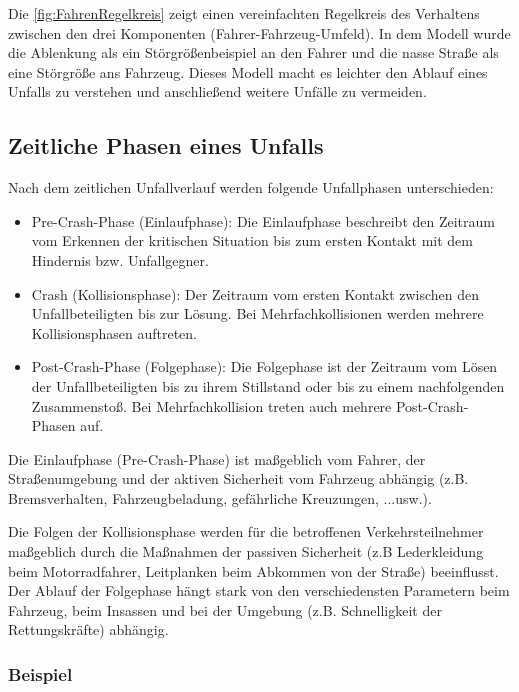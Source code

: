 Die \autoref{fig:FahrenRegelkreis} zeigt einen vereinfachten Regelkreis des Verhaltens zwischen den drei Komponenten (Fahrer-Fahrzeug-Umfeld). In dem Modell wurde die Ablenkung als ein Störgrößenbeispiel an den Fahrer und die nasse Straße als eine Störgröße ans Fahrzeug. Dieses Modell macht es leichter den Ablauf eines Unfalls zu verstehen und anschließend weitere Unfälle zu vermeiden.

%
\subsection{Zeitliche Phasen eines Unfalls}

Nach dem zeitlichen Unfallverlauf werden folgende Unfallphasen unterschieden:
\begin{itemize}
	\item Pre-Crash-Phase (Einlaufphase): 
	Die Einlaufphase beschreibt den Zeitraum vom Erkennen der kritischen Situation bis zum ersten Kontakt mit dem Hindernis bzw. Unfallgegner.
	\item Crash (Kollisionsphase):
	Der Zeitraum vom ersten Kontakt zwischen den Unfallbeteiligten bis zur Lösung. Bei Mehrfachkollisionen werden mehrere Kollisionsphasen auftreten.
	\item Post-Crash-Phase (Folgephase):
	Die Folgephase ist der Zeitraum vom Lösen der Unfallbeteiligten bis zu ihrem Stillstand oder bis zu einem nachfolgenden Zusammenstoß. Bei Mehrfachkollision treten auch mehrere Post-Crash-Phasen auf. 
	
\end{itemize}
Die Einlaufphase (Pre-Crash-Phase) ist maßgeblich vom Fahrer, der Straßenumgebung und der aktiven Sicherheit vom Fahrzeug abhängig (z.B. Bremsverhalten, Fahrzeugbeladung, gefährliche Kreuzungen, ...usw.).
 
Die Folgen der Kollisionsphase werden für die betroffenen Verkehrsteilnehmer maßgeblich durch die Maßnahmen der passiven Sicherheit (z.B Lederkleidung beim Motorradfahrer, Leitplanken beim Abkommen von der Straße) beeinflusst. Der Ablauf der Folgephase hängt stark von den verschiedensten Parametern beim Fahrzeug, beim Insassen und bei der Umgebung (z.B. Schnelligkeit der Rettungskräfte) abhängig.\cite{Appel2002}\\


\subsubsection{Beispiel}

